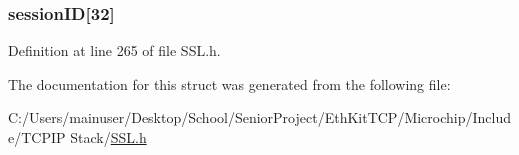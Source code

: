 \hypertarget{struct_s_s_l___s_e_s_s_i_o_n_af0841a9ec57cfe5a2d16970638d00b42}{}
\subsubsection[{session\+I\+D}]{ session\+I\+D\mbox{[}32\mbox{]}}\label{struct_s_s_l___s_e_s_s_i_o_n_af0841a9ec57cfe5a2d16970638d00b42}


Definition at line 265 of file S\+S\+L.\+h.



The documentation for this struct was generated from the following file\+:\begin{DoxyCompactItemize}
\item 
C\+:/\+Users/mainuser/\+Desktop/\+School/\+Senior\+Project/\+Eth\+Kit\+T\+C\+P/\+Microchip/\+Include/\+T\+C\+P\+I\+P Stack/\hyperlink{_s_s_l_8h}{S\+S\+L.\+h}\end{DoxyCompactItemize}
